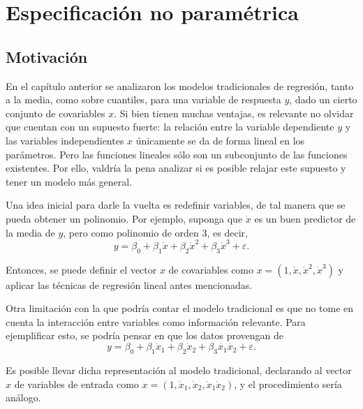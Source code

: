 \chapter[Especificaci\'on no param\'etrica]{Especificaci\'on no param\'etrica}

\section{Motivaci\'on}

En el cap\'itulo anterior se analizaron los modelos tradicionales de regresi\'on, tanto a la media, como sobre cuantiles, para una variable de respuesta $y$, dado un cierto conjunto de covariables $x$. Si bien tienen muchas ventajas, es relevante no olvidar que cuentan con un supuesto fuerte: la relación entre la variable dependiente $y$ y las variables independientes $x$ \'unicamente se da de forma lineal en los par\'ametros. Pero las funciones lineales s\'olo son un subconjunto de las funciones existentes. Por ello, valdr\'ia la pena analizar si es posible relajar este supuesto y tener un modelo m\'as general.

Una idea inicial para darle la vuelta es redefinir variables, de tal manera que se pueda obtener un polinomio. Por ejemplo, suponga que $\dot{x}$ es un buen predictor de la media de $y$, pero como polinomio de orden 3, es decir,
\begin{equation*}
    y = \beta_0 + \beta_1\dot{x} + \beta_2\dot{x}^2 + \beta_3\dot{x}^3 + \varepsilon.
\end{equation*}

Entonces, se puede definir el vector $x$ de covariables como $x = (1,\dot{x},\dot{x}^2,\dot{x}^3)$ y aplicar las t\'ecnicas de regresi\'on lineal antes mencionadas.

Otra limitaci\'on con la que podr\'ia contar el modelo tradicional es que no tome en cuenta la interacci\'on entre variables como informaci\'on relevante. Para ejemplificar esto, se podr\'ia pensar en que los datos provengan de
\begin{equation*}
    y = \beta_0 + \beta_1\dot{x}_1 + \beta_2\dot{x}_2 + \beta_3\dot{x_1}\dot{x_2} + \varepsilon.
\end{equation*}

Es posible llevar dicha representaci\'on al modelo tradicional, declarando al vector $x$ de variables de entrada como $x = (1,\dot{x}_1,\dot{x}_2,\dot{x}_1\dot{x}_2)$, y el procedimiento ser\'ia an\'alogo.


